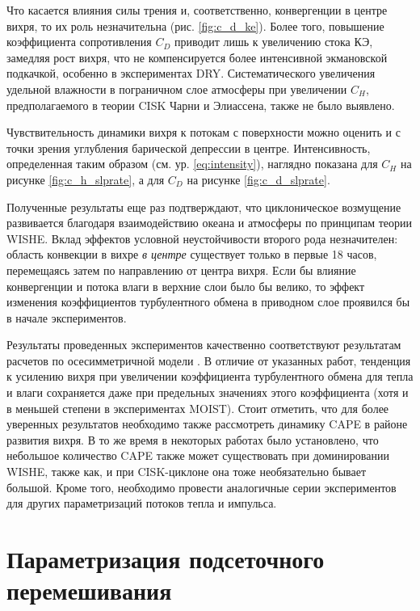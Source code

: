 \documentclass[12pt,a4paper]{report}
\begin{document}
Что касается влияния силы трения и, соответственно, конвергенции в центре вихря, то их роль незначительна (рис. \ref{fig:c_d_ke}). Более того, повышение коэффициента сопротивления $C_D$ приводит лишь к увеличению стока КЭ, замедляя рост вихря, что не компенсируется более интенсивной экмановской подкачкой, особенно в экспериментах DRY. Систематического увеличения удельной влажности в пограничном слое атмосферы при увеличении $C_H$, предполагаемого в теории CISK Чарни и Элиассена, также не было выявлено.

Чувствительность динамики вихря к потокам с поверхности можно оценить и с точки зрения углубления барической депрессии в центре. Интенсивность, определенная таким образом (см. ур. \eqref{eq:intensity}), наглядно показана для $C_H$  на рисунке \ref{fig:c_h_slprate}, а для $C_D$  на рисунке \ref{fig:c_d_slprate}.

Полученные результаты еще раз подтверждают, что циклоническое возмущение развивается благодаря взаимодействию океана и атмосферы по принципам теории WISHE. Вклад эффектов условной неустойчивости второго рода незначителен: область конвекции в вихре \emph{в центре} существует только в первые 18 часов, перемещаясь затем по направлению от центра вихря. Если бы влияние конвергенции и потока влаги в верхние слои было бы велико, то эффект изменения коэффициентов турбулентного обмена в приводном слое проявился бы в начале экспериментов.

Результаты проведенных экспериментов качественно соответствуют результатам расчетов по осесимметричной модели \citep{CraigGray1996, EmanuelRotunno1989}. В отличие от указанных работ, тенденция к усилению вихря при увеличении коэффициента турбулентного обмена для тепла и влаги сохраняется даже при предельных значениях этого коэффициента (хотя и в меньшей степени в экспериментах MOIST). Стоит отметить, что для более уверенных результатов необходимо также рассмотреть динамику CAPE в районе развития вихря. В то же время в некоторых работах было установлено, что небольшое количество CAPE также может существовать при доминировании WISHE, также как, и при CISK-циклоне она тоже необязательно бывает большой. Кроме того, необходимо провести аналогичные серии экспериментов для других параметризаций потоков тепла и импульса.

\section{Параметризация подсеточного перемешивания}
\label{sec:res:closure}
\end{document}
